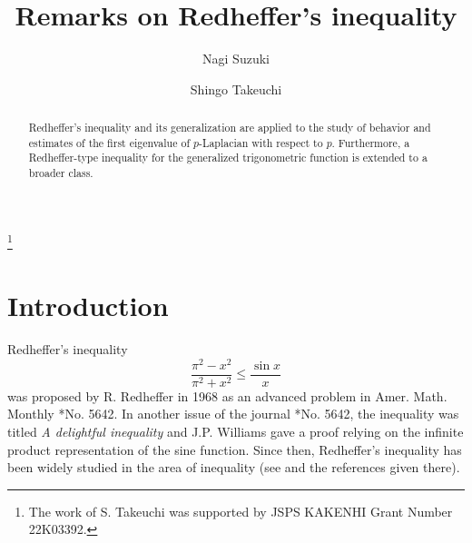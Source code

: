 \documentclass[12pt]{amsart}
\numberwithin{equation}{section}
\theoremstyle{plain}
\theoremstyle{definition}
\theoremstyle{remark}
\begin{document}
\title{Remarks on Redheffer's inequality}

\author{Nagi Suzuki}
\address[Nagi Suzuki]{Department of Mathematical Sciences, Shibaura Institute of Technology, 307 Fukasaku, Minuma-ku, Saitama-shi, Saitama 337-8570, Japan}

\author{Shingo Takeuchi}
\address[Shingo Takeuchi]{Department of Mathematical Sciences, Shibaura Institute of Technology, 307 Fukasaku, Minuma-ku, Saitama-shi, Saitama 337-8570, Japan}
\thanks{The work of S. Takeuchi was supported by JSPS KAKENHI Grant Number 22K03392.}



\begin{abstract}
Redheffer's inequality and its generalization are applied to the study 
of behavior and estimates of the first eigenvalue of $p$-Laplacian with respect to $p$. Furthermore, a Redheffer-type inequality for 
the generalized trigonometric function is extended to a broader class.
\end{abstract}


\maketitle


\section{Introduction}

Redheffer's inequality
\begin{equation}
\label{eq:redheffer}
\frac{\pi^2-x^2}{\pi^2+x^2} \leq \frac{\sin{x}}{x}
\end{equation}
was proposed by R. Redheffer in 1968 as an advanced problem
in Amer. Math. Monthly \cite{JCWSRRZ1968}*{No. 5642}.
In another issue of the journal \cite{RW1969}*{No. 5642}, 
the inequality was titled \textit{A delightful 
inequality} and J.P. Williams gave a proof relying on the infinite product 
representation of the sine function.
Since then, Redheffer's inequality has been widely studied in the area of inequality
(see \cites{W1972,Z2009,ZS2008,LZ2011,SB2015,BS2016,OT2021} and the references given there).
\end{document}
